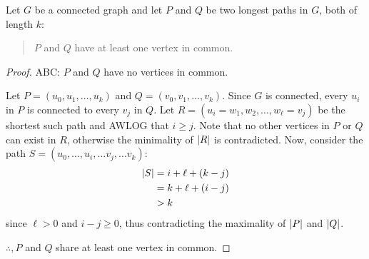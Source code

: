 \documentclass[letterpaper,12pt]{article}
\begin{document}
\begin{theorem}
  Let \(G\) be a connected graph and let \(P\) and \(Q\) be two longest paths in \(G\), both of length \(k\):
  \begin{quote}
    \(P\) and \(Q\) have at least one vertex in common.
  \end{quote}
\end{theorem}

\begin{proof}
  ABC: \(P\) and \(Q\) have no vertices in common.

  Let \(P=(u_0,u_1,\ldots,u_k)\) and \(Q=(v_0,v_1,\ldots,v_k)\).  Since \(G\) is connected, every \(u_i\) in \(P\)
  is connected to every \(v_j\) in \(Q\).  Let \(R=(u_i=w_1,w_2,\ldots,w_{\ell}=v_j)\) be the shortest such path
  and AWLOG that \(i\ge j\).  Note that no other vertices in \(P\) or \(Q\) can exist in \(R\), otherwise the
  minimality of \(\lvert R\rvert\) is contradicted.  Now, consider the path \(S=(u_0,\ldots,u_i,\ldots v_j,\ldots v_k)\):
  \begin{align*}
    \lvert S\rvert &= i+\ell+(k-j) \\
    &= k +\ell+(i-j) \\
    &> k
  \end{align*}
  since \(\ell>0\) and \(i-j\ge0\), thus contradicting the maximality of \(\lvert P\rvert\) and \(\lvert Q\rvert\).

  \(\therefore, P\) and \(Q\) share at least one vertex in common.
\end{proof}
\end{document}
